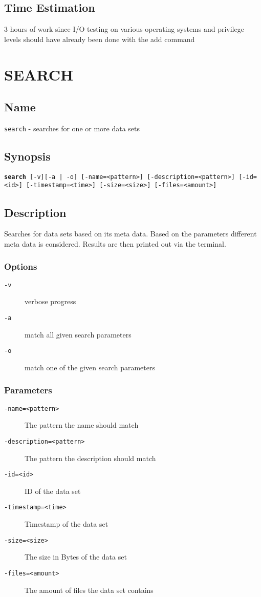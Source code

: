\documentclass{article} %
\begin{document}
				\subsection*{Time Estimation}
				3 hours of work since I/O testing on various operating systems and privilege levels should have already been done with the add command \\
				\noindent
		\newpage
		
		\section*{SEARCH}
		\subsection*{Name}
		\texttt{search} - searches for one or more data sets
		\subsection*{Synopsis}
		\texttt{\textbf{search} [-v][-a | -o] [-name=<pattern>] [-description=<pattern>] [-id=<id>] [-timestamp=<time>] [-size=<size>] [-files=<amount>]}
		\subsection*{Description}
		Searches for data sets based on its meta data. Based on the parameters different meta data is considered. Results are then printed out via the terminal.\\
		
		\noindent
		\subsubsection*{Options}
		\begin{description}
			\item[\texttt{-v}] verbose progress
			\item[\texttt{-a}] match all given search parameters
			\item[\texttt{-o}] match one of the given search parameters
		\end{description}
		
		\subsubsection*{Parameters}
		\begin{description}
			\item[\texttt{-name=<pattern>}] The pattern the name should match
			\item[\texttt{-description=<pattern>}] The pattern the description should match
			\item[\texttt{-id=<id>}] ID of the data set
			\item[\texttt{-timestamp=<time>}] Timestamp of the data set
			\item[\texttt{-size=<size>}] The size in Bytes of the data set
			\item[\texttt{-files=<amount>}] The amount of files the data set contains
		\end{description}
\end{document}
